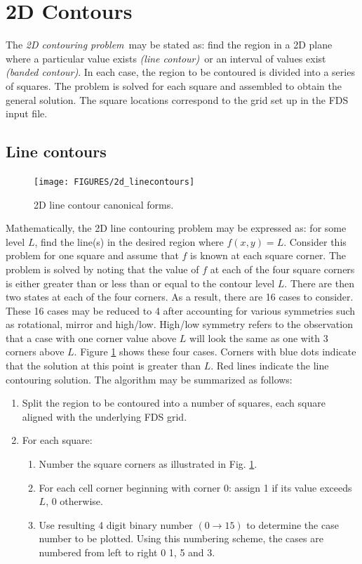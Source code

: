 \documentclass[11pt,twoside]{book}
\begin{document}
%
%

\section{2D Contours}

The {\em 2D contouring problem}\ may be stated as: find the region
in a 2D plane where a particular value exists {\em (line
contour)}\ or an interval of values exist {\em (banded contour)}.
In each case, the  region to be contoured is divided into a series
of squares.  The problem is solved for each square and assembled
to obtain the general solution.  The square locations correspond
to the grid set up in the FDS input file.

\subsection{Line contours}
\begin{figure}[\figoptions]
\begin{center}
\texttt{[image: FIGURES/2d\_linecontours]}
\end{center}
\caption{2D line contour canonical forms.
  }
\label{fig2dline}%
\end{figure}
Mathematically, the 2D line contouring problem may be expressed
as: for some level $L$, find the line(s) in the desired region
where $f(x,y)=L$.  Consider this problem for one square and assume
that $f$ is known at each square corner.  The problem is solved by
noting that the value of $f$ at each of the four square corners is
either greater than or less than or equal to the contour level
$L$.  There are then two states at each of the four corners.  As a
result, there are 16 cases to consider.  These 16 cases may be
reduced to 4 after accounting for various symmetries such as
rotational, mirror and high/low.  High/low symmetry refers to the
observation that a case with one corner value above $L$ will look
the same as one with 3 corners above $L$. Figure \ref{fig2dline}
shows these four cases.  Corners with blue dots indicate that the
solution at this point is greater than $L$.  Red lines indicate
the line contouring solution.  The algorithm may be summarized as
follows:
\begin{enumerate}
\item Split the region to be contoured into a number of squares,
each square aligned with the underlying FDS grid.

\item For  each square:
\begin{enumerate}
\item Number the square corners as illustrated in Fig.
\ref{fig2dline}.

\item For each cell corner beginning with corner 0: assign 1 if
its value exceeds $L$, 0 otherwise.

\item Use resulting 4 digit binary number $(0\rightarrow 15)$ to
determine the case number to be plotted.  Using this numbering
scheme, the cases are numbered from left to right 0 1, 5 and 3.
\end{enumerate}
\end{enumerate}
\end{document}
